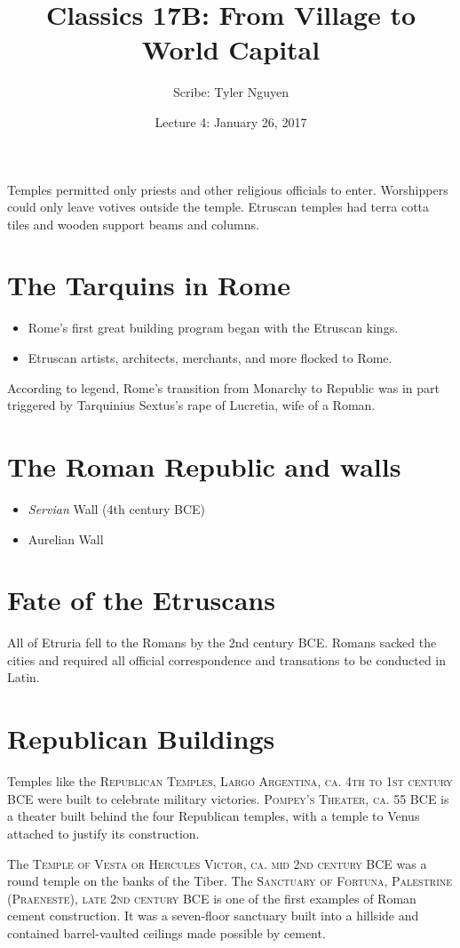 \documentclass{article}
\begin{document}
\title{Classics 17B: From Village to World Capital}
\author{Scribe: Tyler Nguyen}
\date{Lecture 4: January 26, 2017}
\maketitle
Temples permitted only priests and other religious officials to enter.  Worshippers could only leave votives outside the temple.  Etruscan temples had terra cotta tiles and wooden support beams and columns.
\section{The Tarquins in Rome}
\begin{itemize}
\item Rome's first great building program began with the Etruscan kings.
\item Etruscan artists, architects, merchants, and more flocked to Rome.
\end{itemize}
According to legend, Rome's transition from Monarchy to Republic was in part triggered by Tarquinius Sextus's rape of Lucretia, wife of a Roman.
\section{The Roman Republic and walls}
\begin{itemize}
\item \textit{Servian} Wall (4th century BCE)
\item Aurelian Wall
\end{itemize}
\section{Fate of the Etruscans}
All of Etruria fell to the Romans by the 2nd century BCE.  Romans sacked the cities and required all official correspondence and transations to be conducted in Latin.
\section{Republican Buildings}
Temples like the \textsc{Republican Temples, Largo Argentina, ca. 4th to 1st century BCE} were built to celebrate military victories.  \textsc{Pompey's Theater, ca. 55 BCE} is a theater built behind the four Republican temples, with a temple to Venus attached to justify its construction.

The \textsc{Temple of Vesta or Hercules Victor, ca. mid 2nd century BCE} was a round temple on the banks of the Tiber.  The \textsc{Sanctuary of Fortuna, Palestrine (Praeneste), late 2nd century BCE} is one of the first examples of Roman cement construction.  It was a seven-floor sanctuary built into a hillside and contained barrel-vaulted ceilings made possible by cement.
\end{document}
